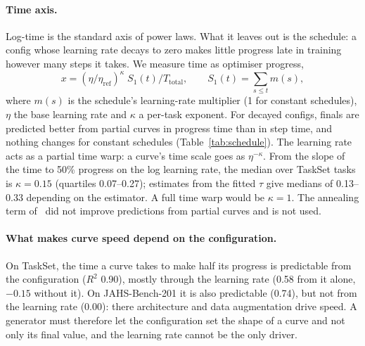 \documentclass[10pt]{article}
\begin{document}
\paragraph{Time axis.} Log-time is the standard axis of power laws. What it leaves out is the schedule: a config
whose learning rate decays to zero makes little progress late in training however many steps it takes. We measure
time as optimiser progress,
\begin{equation}
  x = (\eta/\eta_\text{ref})^{\kappa}\; S_1(t)/T_\text{total}, \qquad S_1(t) = \textstyle\sum_{s \le t} m(s),
  \label{eq:progress}
\end{equation}
where $m(s)$ is the schedule's learning-rate multiplier (1 for constant schedules), $\eta$ the base learning rate
and $\kappa$ a per-task exponent. For decayed configs, finals are predicted better from partial curves in progress
time than in step time, and nothing changes for constant schedules (Table~\ref{tab:schedule}). The learning rate
acts as a partial time warp: a curve's time scale goes as $\eta^{-\kappa}$. From the slope of the time to 50\%
progress on the log learning rate, the median over TaskSet tasks is $\kappa = 0.15$ (quartiles 0.07--0.27); estimates
from the fitted $\tau$ give medians of 0.13--0.33 depending on the estimator. A full time warp would be $\kappa = 1$. The annealing term of~\cite{tissue2024scaling} did not improve predictions from partial
curves and is not used.

\begin{table}[t]
\centering\small
\caption{Time axis, compared on TaskSet fit tasks with schedule hyperparameters: Eq.~\eqref{eq:bpl} fitted on the first
40\% of each curve on the log-excess scale, in step time or in progress time $S_1$ (Eq.~\ref{eq:progress}). Bold: the
better axis (none if equal). Error of finals as a share of the task range. nadamw with an (almost) constant schedule
has too few curves per task to rank.}
\label{tab:schedule}

\end{table}

\paragraph{What makes curve speed depend on the configuration.} On TaskSet, the time a curve takes to make half its
progress is predictable from the configuration ($R^2$ 0.90), mostly through the learning rate (0.58 from it alone,
$-0.15$ without it). On JAHS-Bench-201 it is also predictable (0.74), but not from the learning rate (0.00): there
architecture and data augmentation drive speed. A generator must therefore let the configuration set the shape of
a curve and not only its final value, and the learning rate cannot be the only driver.
\end{document}
